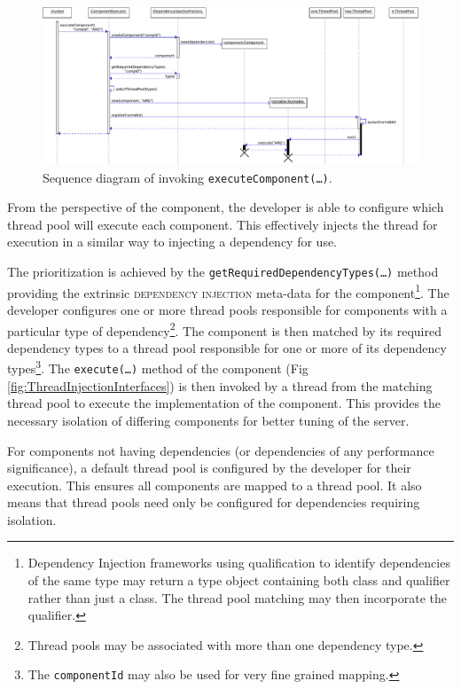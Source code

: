 \documentclass[prodmode]{style/acmlarge}
\begin{document}
\begin{figure}[!t]
\centering
\includegraphics[width=6in]{ExecuteComponentSequenceDiagram}
\caption{Sequence diagram of invoking \texttt{executeComponent(\ldots)}.}
\label{fig:ExecuteComponentSequenceDiagram}
\end{figure}

From the perspective of the component, the developer is able to configure which
thread pool will execute each component.  This effectively injects the thread
for execution in a similar way to injecting a dependency for use.

The prioritization is achieved by the
\texttt{getRequiredDependencyTypes(\ldots)} method providing the extrinsic
\textsc{dependency injection} \cite{ioc} meta-data for the
component\footnote{Dependency Injection frameworks using qualification to
identify dependencies of the same type may return a type object containing both
class and qualifier rather than just a class.  The thread pool matching may then
incorporate the qualifier.}.  The developer configures one or more thread pools
responsible for components with a particular type of dependency\footnote{Thread
pools may be associated with more than one dependency type.}.  The component is
then matched by its required dependency types to a thread pool responsible for
one or more of its dependency types\footnote{The \texttt{componentId} may also
be used for very fine grained mapping.}.  The \texttt{execute(\ldots)} method of
the component (Fig \ref{fig:ThreadInjectionInterfaces}) is then invoked by a thread
from the matching thread pool to execute the implementation of the component.
This provides the necessary isolation of differing components for better tuning
of the server.

For components not having dependencies (or dependencies of any
performance significance), a default thread pool is configured by the developer
for their execution.  This ensures all components are mapped to a
thread pool.  It also means that thread pools need only be configured for
dependencies requiring isolation.
\end{document}
